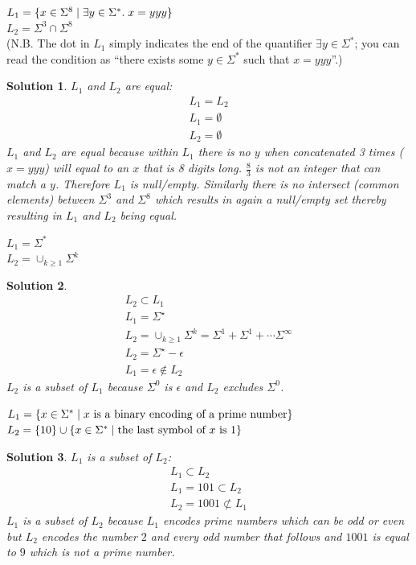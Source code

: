 \documentclass[11pt]{article}
\newtheorem*{solution}{Solution}
\begin{document}
\begin{qunlist}
\begin{qparts}
    \item
    $L_1 = \{ x \in \Sigma^8 \;|\; \exists y \in \Sigma^* . \; x = yyy \}$ \\
    $L_2 = \Sigma^3 \cap \Sigma^8$ \\
    \quad (N.B. The dot in $L_1$ simply indicates the end of the quantifier $\exists y \in \Sigma^*$; you can read the condition as ``there exists some $y \in \Sigma^*$ such that $x = yyy$''.)
    \begin{solution}
      $L_1$ and $L_2$ are equal:
      \begin{gather}
        L_1 = L_2\\
        L_1 = \emptyset \\
        L_2 = \emptyset
      \end{gather}
      $L_1$ and $L_2$ are equal because within $L_1$ there is no $y$ when concatenated 3 times ($x=yyy$) will equal to an $x$ that is 8 digits long. $\frac83$ is not an integer that can match a $y$. Therefore $L_1$ is null/empty. Similarly there is no intersect (common elements) between $\Sigma^3$ and $\Sigma^8$ which results in again a null/empty set thereby resulting in $L_1$ and $L_2$ being equal.
    \end{solution}

    \item
    $L_1 = \Sigma^*$ \\
    $L_2 = \cup_{k \ge 1} \Sigma^k$
    \begin{solution}
      \begin{gather}
        L_2 \subset L_1\\
        L_1 = \Sigma^{\star}\\
        L_2 = \cup_{k \ge 1} \Sigma^k = \Sigma^{1} + \Sigma^{1} + \cdots \Sigma^{\infty} \\
        \nonumber L_2 = \Sigma^{\star}-\epsilon\\
        L_1 = \epsilon \not\in L_2
      \end{gather}
      $L_2$ is a subset of $L_1$ because $\Sigma^0$ is $\epsilon$ and $L_2$ excludes $\Sigma^0$.
    \end{solution}

    \item
    $L_1 = \{ x \in \Sigma^* \;|\; x \text{ is a binary encoding of a prime number} \}$ \\
    $L_2 = \{ 10 \} \cup \{ x \in \Sigma^* \;|\; \text{the last symbol of $x$ is 1} \}$
    \begin{solution}
      $L_1$ is a subset of $L_2$:
      \begin{gather}
        L_1 \subset L_2\\
        L_1 = 101 \subset L_2\\
        L_2 = 1001 \not\subset L_1
      \end{gather}
      $L_1$ is a subset of $L_2$ because $L_1$ encodes prime numbers which can be odd or even but $L_2$ encodes the number $2$ and every odd number that follows and $1001$ is equal to $9$ which is not a prime number.
    \end{solution}


\end{qparts}
\end{qunlist}
\end{document}
